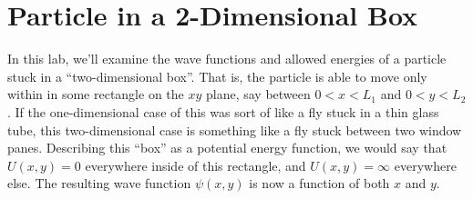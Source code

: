 \section{Particle in a 2-Dimensional Box}

\makelabheader %

\bigskip

In this lab, we'll examine the wave functions and allowed energies of a particle stuck in a ``two-dimensional box''.  That is, the particle is able to move only within in some rectangle on the $xy$ plane, say between $0<x<L_1$ and  $0<y<L_2$.  If the one-dimensional case of this was sort of like a fly stuck in a thin glass tube, this two-dimensional case is something like a fly stuck between two window panes.  Describing this ``box'' as a potential energy function, we would say that $U(x,y)=0$ everywhere inside of this rectangle, and $U(x,y)=\infty$  everywhere else.  The resulting wave function $\psi(x,y)$ is now a function of both $x$ and $y$. 

